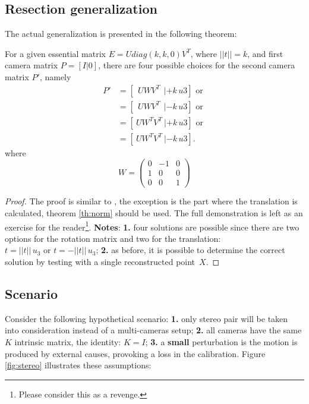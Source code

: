 \subsection{Resection generalization}
The actual generalization is presented in the following theorem:
\begin{theorem}
\label{th:generalization}
For a given essential matrix $E = U diag(k,k,0) V^T$, where $||t||=k$, and first camera matrix
$P = [I | 0]$, there are four possible choices for the second camera matrix $P'$, namely
\begin{align*}
P' & = [~~UWV^T ~ ~| +k\,u3] \mbox{~or~} \\
   & = [~~UWV^T ~ ~| -k\,u3] \mbox{~or~} \\
   & = [~UW^TV^T ~ | +k\,u3] \mbox{~or~} \\
   & = [~UW^TV^T ~ | -k\,u3 ].
\end{align*}
where
\begin{equation}
\label{eq:W}
W =
\begin{pmatrix}
  0 & -1  & 0 \\
  1 &  0  & 0 \\
  0 &  0  & 1
\end{pmatrix}
\end{equation}
\end{theorem}

\begin{proof}
The proof is similar to \cite[Result 9.18 and Result 9.19]{HZ2}, the exception is the part where the translation is calculated, theorem \ref{th:norm} should be used. The full demonstration is left as an exercise for the reader\footnote{Please consider this as a revenge.}. \textbf{Notes}: \textbf{1.} four solutions are possible since there are two options for the rotation matrix and two for the translation: $t = ||t||\,u_3 \mbox{~or~} t=-||t||\,u_3$; \textbf{2.} as before, it is possible to determine the correct solution by testing with a single reconstructed point~$X$.
\end{proof}



\subsection{Scenario}

Consider the following hypothetical scenario: \textbf{1.} only stereo pair will be taken into consideration instead of a multi-cameras setup; \textbf{2.} all cameras have the same $K$ intrinsic matrix, the identity: $K = I$; \textbf{3.} a \textbf{small} perturbation is the motion is produced by external causes, provoking a loss in the calibration. Figure \ref{fig:stereo} illustrates these assumptions:

